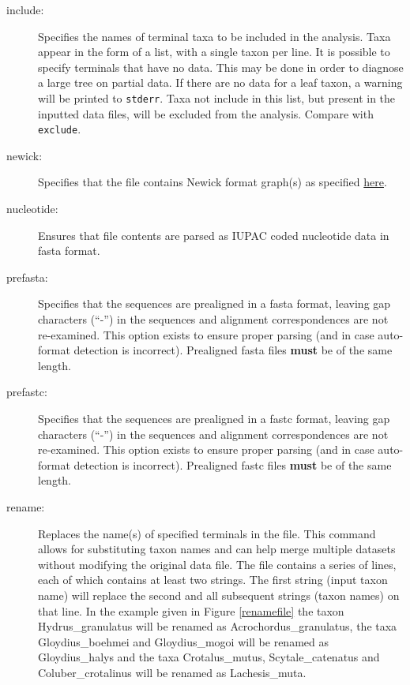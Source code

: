 \begin{description}
		\item [include:] Specifies the names of terminal taxa to be included in the analysis. 
		Taxa appear in the form of a list, with a single taxon per line. It is possible to specify 
		terminals that have no data. This may be done in order to diagnose a large tree on 
		partial data. If there are no data for a leaf taxon, a warning will be printed to \texttt{stderr}. 
		Taxa not include in this list, but present in the inputted data files, will be excluded from 
		the analysis. Compare with \texttt{exclude}.
			
		\item [newick:] Specifies that the file contains Newick format graph(s) as specified 
		\href{https://evolution.genetics.washington.edu/phylip/newick_doc.html}{here}.
			
		\item [nucleotide:] Ensures that file contents are parsed as IUPAC coded nucleotide data 
		in fasta \citep{PearsonandLipman1988} format.
			
		\item [prefasta:] Specifies that the sequences are prealigned in a fasta format, leaving 
		gap characters (``-'') in the sequences and alignment correspondences are not re-examined. 
		This option exists to ensure proper parsing (and in case auto-format detection is incorrect).
		Prealigned fasta files \textbf{must} be of the same length.
			
		\item [prefastc:] Specifies that the sequences are prealigned in a fastc format, leaving gap 
		characters (``-'') in the sequences and alignment correspondences are not re-examined. 
		This option exists to ensure proper parsing (and in case auto-format detection is incorrect).
		Prealigned fastc files \textbf{must} be of the same length.			
		
		\item [rename:] Replaces the name(s) of specified terminals in the file. This command allows 
		for substituting taxon names and can help merge multiple datasets without modifying the 
		original data file. The file contains a series of lines, each of which contains at least two strings. 
		The first string (input taxon name) will replace the second and all subsequent strings (taxon 
		names) on that line. In the example given in Figure \ref{renamefile} the taxon Hydrus\_granulatus 
		will be renamed as Acrochordus\_granulatus, the taxa Gloydius\_boehmei and Gloydius\_mogoi
		will be renamed as Gloydius\_halys and the taxa Crotalus\_mutus, Scytale\_catenatus and 
		Coluber\_crotalinus will be renamed as Lachesis\_muta.
		

\end{description}
